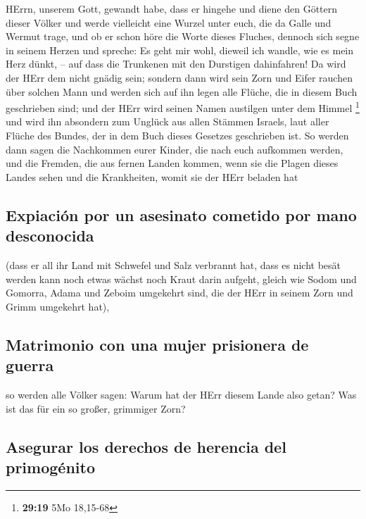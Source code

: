 HErrn, unserem Gott, gewandt habe, dass er hingehe und diene den Göttern
dieser Völker und werde vielleicht eine Wurzel unter euch, die da Galle
und Wermut trage,  und ob er schon höre die Worte dieses
Fluches, dennoch sich segne in seinem Herzen und spreche: Es geht mir
wohl, dieweil ich wandle, wie es mein Herz dünkt, -- auf dass die
Trunkenen mit den Durstigen dahinfahren!  Da wird der
HErr dem nicht gnädig sein; sondern dann wird sein Zorn und Eifer
rauchen über solchen Mann und werden sich auf ihn legen alle Flüche, die
in diesem Buch geschrieben sind; und der HErr wird seinen Namen
austilgen unter dem Himmel \footnote{\textbf{29:19} 5Mo 18,15-68}
 und wird ihn absondern zum Unglück aus allen Stämmen
Israels, laut aller Flüche des Bundes, der in dem Buch dieses Gesetzes
geschrieben ist.  So werden dann sagen die Nachkommen
eurer Kinder, die nach euch aufkommen werden, und die Fremden, die aus
fernen Landen kommen, wenn sie die Plagen dieses Landes sehen und die
Krankheiten, womit sie der HErr beladen hat

\hypertarget{expiaciuxf3n-por-un-asesinato-cometido-por-mano-desconocida}{%
\subsection{Expiación por un asesinato cometido por mano
desconocida}\label{expiaciuxf3n-por-un-asesinato-cometido-por-mano-desconocida}}

 (dass er all ihr Land mit Schwefel und Salz verbrannt
hat, dass es nicht besät werden kann noch etwas wächst noch Kraut darin
aufgeht, gleich wie Sodom und Gomorra, Adama und Zeboim umgekehrt sind,
die der HErr in seinem Zorn und Grimm umgekehrt hat),

\hypertarget{matrimonio-con-una-mujer-prisionera-de-guerra}{%
\subsection{Matrimonio con una mujer prisionera de
guerra}\label{matrimonio-con-una-mujer-prisionera-de-guerra}}

 so werden alle Völker sagen: Warum hat der HErr diesem
Lande also getan? Was ist das für ein so großer, grimmiger Zorn?

\hypertarget{asegurar-los-derechos-de-herencia-del-primoguxe9nito}{%
\subsection{Asegurar los derechos de herencia del
primogénito}\label{asegurar-los-derechos-de-herencia-del-primoguxe9nito}}

